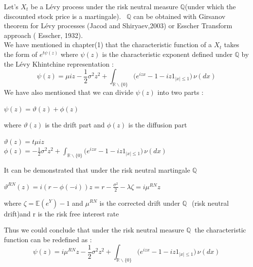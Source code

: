 \documentclass[12pt]{report}
\begin{document}
Let's $X_t$ be a Lévy process under the risk neutral measure $\mathbb{Q}$(under which the discounted stock price is a martingale).~ $\mathbb{Q}$ can be obtained with  Girsanov theorem for Lévy processes (Jacod and Shiryaev,2003) or Esscher Transform approach ( Esscher, 1932).\\ 
We have mentioned in chapter(1) that the characteristic function of a $X_t$ takes the form of $e^{t \psi(z)}$
where  $\psi(z)$ is the characteristic exponent defined under $\mathbb{Q}$ by the Lévy Khintchine representation : 
\begin{equation}
\psi (z)= \mu iz - \frac{1}{2}\sigma^2  z^2 + 
\int_{\mathbb{R}\backslash\{0\}} \big( e^{izx}-1 -iz 1_{|x| \leq  1  } \big)\,\nu(dx) 
\end{equation}
We have also mentioned that we can divide $\psi (z)$ into two parts :
\begin{center}
$\psi(z)= \vartheta(z)+\phi(z)$
\end{center}
where $ \vartheta(z)$ is the drift part and $\phi(z)$ is the diffusion part 
\begin{center}
$ \vartheta(z)=t \mu iz$\\
$ \phi(z)= - \frac{1}{2}\sigma^2  z^2 + 
\int_{\mathbb{R}\backslash\{0\}} \big( e^{izx}-1 -iz 1_{|x| \leq  1  } \big)\,\nu(dx)$
\end{center}
It can be demonstrated that under the risk neutral martingale $\mathbb{Q}$
\begin{center}
 $\vartheta^{RN}(z)=i(r-\phi(-i))z=r-\frac{\sigma^2}{2}-\lambda \zeta=i\mu^{RN} z$ 
\end{center}
where $\zeta=\mathbb{E}(e^Y)-1$ and $\mu^{RN}$ is the corrected drift under $\mathbb{Q}~$~(risk neutral drift)and r is the risk free interest rate 

Thus we could conclude that under the risk neutral measure $\mathbb{Q}~$ the characteristic function can be redefined as :
\begin{equation}
\psi (z)= i\mu^{RN} z - \frac{1}{2}\sigma^2  z^2 + 
\int_{\mathbb{R}\backslash\{0\}} \big( e^{izx}-1 -iz 1_{|x| \leq  1  } \big)\,\nu(dx) 
\end{equation}
\end{document}
